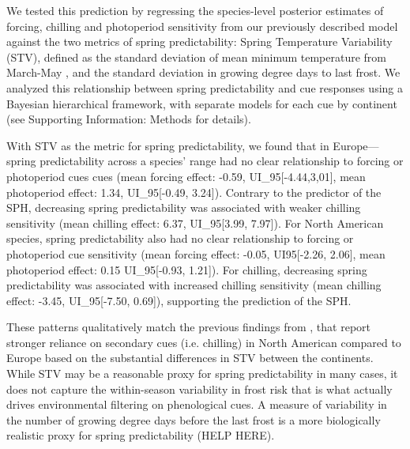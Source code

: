 \documentclass[12pt]{article}
\begin{document}
We tested this prediction by regressing the species-level posterior estimates of forcing, chilling and photoperiod sensitivity from our previously described model against the two metrics of spring predictability: Spring Temperature Variability (STV), defined as the standard deviation of mean minimum temperature from March-May \citep[See Supporting Information Methods][]{Zohner:2017aa}, and the standard deviation in growing degree days to last frost. We analyzed this relationship between spring predictability and cue responses using a Bayesian hierarchical framework, with separate models for each cue by continent (see Supporting Information: Methods for details). 

With STV as the metric for spring predictability, we found that in Europe---spring predictability across a species' range had no clear relationship to forcing or photoperiod cues cues (mean forcing effect: -0.59, UI_{95}[-4.44,3,01], mean photoperiod effect: 1.34, UI_{95}[-0.49, 3.24]). Contrary to the predictor of the SPH, decreasing spring predictability was associated with weaker chilling sensitivity (mean chilling effect: 6.37, UI_{95}[3.99, 7.97]). For North American species, spring predictability also had no clear relationship to forcing or photoperiod cue sensitivity (mean forcing effect: -0.05, UI{95}[-2.26, 2.06], mean photoperiod effect: 0.15 UI_{95}[-0.93, 1.21]). For chilling, decreasing spring predictability was associated with increased chilling sensitivity (mean chilling effect: -3.45, UI_{95}[-7.50, 0.69]), supporting the prediction of the SPH.

These patterns qualitatively match the previous findings from \citet{Zohner:2017aa}, that report stronger reliance on secondary cues (i.e. chilling) in North American compared to Europe based on the substantial differences in STV between the continents. While STV may be a reasonable proxy for spring predictability in many cases, it does not capture the within-season variability in frost risk that is what actually drives environmental filtering on phenological cues. A measure of variability in the number of growing degree days before the last frost is a more biologically realistic proxy for spring predictability (HELP HERE).
\end{document}

